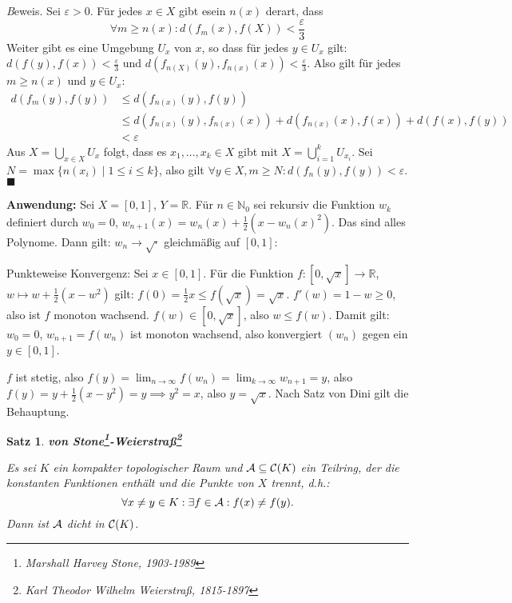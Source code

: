 \documentclass[12pt]{scrbook}   %
\newtheorem{satzX}[alles]{Satz}
\newenvironment{satz}[1]{\begin{satzX}{\bf #1}\nopagebreak\par}{\end{satzX}}
\newcommand{\qed}{\phantom{.}\hfill{$\blacksquare$}}
\begin{document}
{\textit Beweis.}
Sei $\varepsilon >0$. Für jedes $x\in X$ gibt esein $n(x)$ derart, dass
\[
\forall m \ge n(x): d(f_m(x),f(X)) < \frac\varepsilon3
\]
Weiter gibt es eine Umgebung $U_x$ von $x$, so dass für jedes $y\in U_x$ gilt: $d(f(y),f(x)) < \frac\varepsilon3$ und $d(f_{n(X)}(y), f_{n(x)}(x)) < \frac\varepsilon3$. Also gilt für jedes $m\ge n(x)$ und $y\in U_x$:
\begin{align*}
d(f_m(y), f(y)) &\le d(f_{n(x)}(y), f(y)) \\&\le d(f_{n(x)}(y), f_{n(x)}(x)) + d(f_{n(x)}(x), f(x)) +  d(f(x), f(y)) \\&< \varepsilon
\end{align*}
Aus $X=\bigcup_{x\in X}U_x$ folgt, dass es $x_1,\ldots,x_k\in X$ gibt mit $X=\bigcup_{i=1}^k U_{x_i}$. Sei $N=\max\{n(x_i)\mid 1\le i \le k\}$, also gilt $\forall y\in X, m\ge N: d(f_n(y),f(y))<\varepsilon$.\qed


\textbf{Anwendung:} Sei $X=[0,1]$, $Y=\mathbb R$. Für $n\in \mathbb N_0$ sei rekursiv die Funktion $w_k$ definiert durch $w_0=0$, $w_{n+1}(x) = w_n(x) + \frac12(x-w_n(x)^2)$. Das sind alles Polynome. Dann gilt: $w_n\to \sqrt\cdot$ gleichmäßig auf $[0,1]$:

Punkteweise Konvergenz: Sei $x\in [0,1]$. Für die Funktion $f:[0,\sqrt x] \to \mathbb R$, $w\mapsto w + \frac12 (x-w^2)$ gilt: $f(0) = \frac12x \le f(\sqrt x) = \sqrt x$. $f'(w) = 1-w\ge 0$, also ist $f$ monoton wachsend. $f(w) \in [0,\sqrt x]$, also $w\le f(w)$. Damit gilt: $w_0=0$, $w_{n+1} = f(w_n)$ ist monoton wachsend, also konvergiert $(w_n)$ gegen ein $y\in [0,1]$.

$f$ ist stetig, also $f(y) = \lim_{n\to\infty} f(w_n) = \lim_{k\to \infty}w_{n+1} = y$, also $f(y) = y + \frac12(x-y^2) = y \implies y ^2 = x$, also $y=\sqrt x$. Nach Satz von Dini gilt die Behauptung.

\begin{satz}{von Stone\footnote{Marshall Harvey Stone, 1903-1989}-Weierstra\ss\footnote{Karl Theodor Wilhelm Weierstra\ss, 1815-1897}}
Es sei $K$ ein kompakter topologischer Raum und ${\cal A}\subseteq {\cal C}(K)$
ein Teilring, der die konstanten Funktionen enthält und die Punkte von $X$ trennt, d.h.:
$$\forall x\neq y\in K:\exists f\in {\cal A}:f(x) \ne f(y).$$
Dann ist $\cal A$ dicht in ${\cal C}(K)$.
\end{satz}

\end{document}
